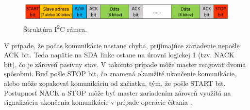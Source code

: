 \begin{figure}
    \centerline{\includegraphics[width=1\textwidth]{images/i2cFrame.png}}
    \caption[Štruktúra I\textsuperscript{2}C rámca]{Štruktúra I\textsuperscript{2}C rámca.}
    \label{obr:i2cFrame}
\end{figure}

V prípade, že počas komunikácie nastane chyba, prijímajúce zariadenie nepošle ACK bit. Teda napätie na SDA linke ostane na úrovni logickej 1 (tzv. NACK bit), čo je zároveň pasívny stav. V takomto prípade môže master reagovať dvoma spôsobmi. Buď pošle STOP bit, čo znamená okamžité ukončenie komunikácie, alebo môže zopakovať komunikáciu od začiatku, tým, že pošle START bit. Postupnosť NACK a STOP môže byť master zariadením zároveň využitá na signalizáciu ukončenia komunikácie v prípade operácie čítania \cite{i2cSpec}.